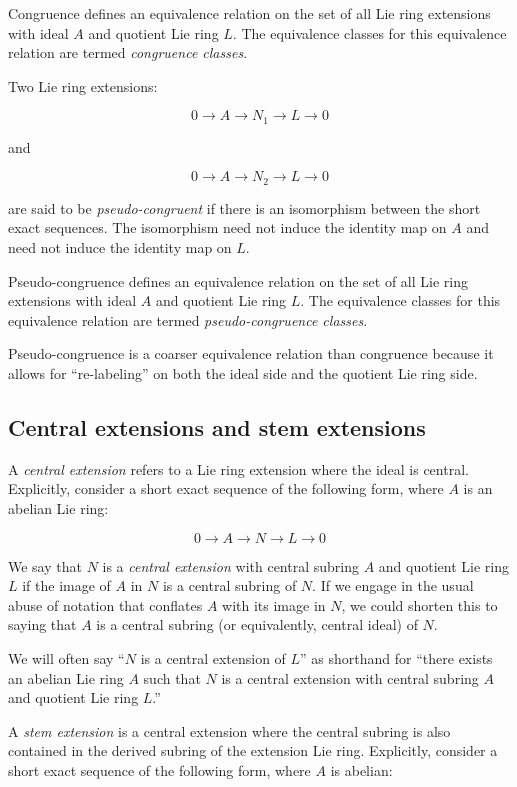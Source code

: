 Congruence defines an equivalence relation on the set of all Lie ring
extensions with ideal $A$ and quotient Lie ring $L$. The
equivalence classes for this equivalence relation are termed {\em
  congruence classes}.

Two Lie ring extensions:

$$0 \to A \to N_1 \to L \to 0$$

and

$$0 \to A \to N_2 \to L \to 0$$

are said to be {\em pseudo-congruent} if there is an isomorphism
between the short exact sequences. The isomorphism need not induce the
identity map on $A$ and need not induce the identity map on $L$.

Pseudo-congruence defines an equivalence relation on the set of all
Lie ring extensions with ideal $A$ and quotient Lie ring $L$. The
equivalence classes for this equivalence relation are termed {\em
  pseudo-congruence classes}.

Pseudo-congruence is a coarser equivalence relation than congruence
because it allows for ``re-labeling'' on both the ideal side and the
quotient Lie ring side.

\subsection{Central extensions and stem extensions}\label{sec:central-and-stem-extension-lie}

A {\em central extension} refers to a Lie ring extension where the
ideal is central. Explicitly, consider a short exact sequence of
the following form, where $A$ is an abelian Lie ring:

$$0 \to A \to N \to L \to 0$$

We say that $N$ is a {\em central extension} with central subring $A$
and quotient Lie ring $L$ if the image of $A$ in $N$ is a central
subring of $N$. If we engage in the usual abuse of notation that
conflates $A$ with its image in $N$, we could shorten this to saying
that $A$ is a central subring (or equivalently, central ideal) of $N$.

We will often say ``$N$ is a central extension of $L$'' as shorthand
for ``there exists an abelian Lie ring $A$ such that $N$ is a central
extension with central subring $A$ and quotient Lie ring $L$.''

A {\em stem extension} is a central extension where the central
subring is also contained in the derived subring of the extension
Lie ring. Explicitly, consider a short exact sequence of the following
form, where $A$ is abelian:

